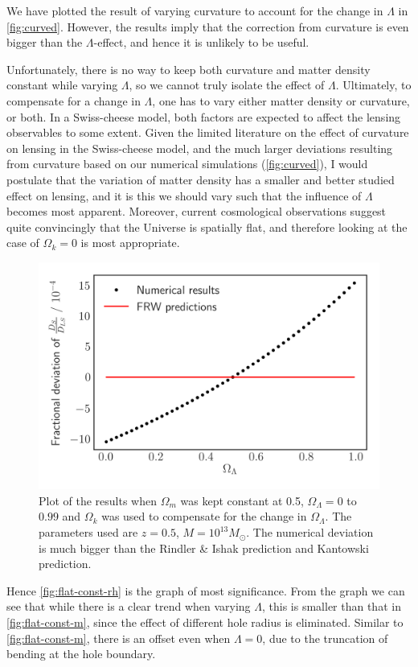 We have plotted the result of varying curvature to account for the change in $\Lambda$ in \autoref{fig:curved}. However, the results imply that the correction from curvature is even bigger than the $\Lambda$-effect, and hence it is unlikely to be useful. 

Unfortunately, there is no way to keep both curvature and matter density constant while varying $\Lambda$, so we cannot truly isolate the effect of $\Lambda$. Ultimately, to compensate for a change in $\Lambda$, one has to vary either matter density or curvature, or both. In a Swiss-cheese model, both factors are expected to affect the lensing observables to some extent. Given the limited literature on the effect of curvature on lensing in the Swiss-cheese model, and the much larger deviations resulting from curvature based on our numerical simulations (\autoref{fig:curved}), I would postulate that the variation of matter density has a smaller and better studied effect on lensing, and it is this we should vary such that the influence of $\Lambda$ becomes most apparent. Moreover, current cosmological observations \citep{ade2016planck,hinshaw2013nine,de2000flat} suggest quite convincingly that the Universe is spatially flat, and therefore looking at the case of $\Omega_k = 0$ is most appropriate. 

\begin{figure}
  \centering
  \includegraphics[height=0.5\linewidth]{images/curved.png}
  \caption{Plot of the results when $\Omega_{m}$ was kept constant at 0.5, $\Omega_{\Lambda} = 0$ to $0.99$ and $\Omega_k$ was used to compensate for the change in $\Omega_{\Lambda}$. The parameters used are $z = 0.5$, $M = 10^{13} M_{\odot}$. The numerical deviation is much bigger than the Rindler \& Ishak prediction and Kantowski prediction.}
  \label{fig:curved}
\end{figure}

Hence \autoref{fig:flat-const-rh} is the graph of most significance. From the graph we can see that while there is a clear trend when varying $\Lambda$, this is smaller than that in \autoref{fig:flat-const-m}, since the effect of different hole radius is eliminated. Similar to \autoref{fig:flat-const-m}, there is an offset even when $\Lambda = 0$, due to the truncation of bending at the hole boundary. 

